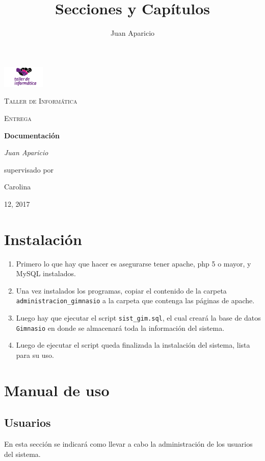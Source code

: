 \documentclass[a4paper, 12pt, spanish]{report}
\title{Secciones y Capítulos}
\author{Juan Aparicio}
\begin{document}
\begin{titlepage}
	\centering
	\includegraphics[width=0.15\textwidth]{imagenes/logo.png}\par\vspace{1cm}
	{\scshape\LARGE Taller de Informática\par}
	\vspace{1cm}
	{\scshape\Large Entrega\par}
	\vspace{1.5cm}
	{\huge\bfseries Documentación\par}
	\vspace{2cm}
	{\Large\itshape Juan Aparicio\par}
	\vfill
	supervisado por \par
	Carolina 		
	\vfill
	{\large 12, 2017\par}
\end{titlepage}

\tableofcontents
\newpage


\chapter{Instalación}
\begin{enumerate}
	\item Primero lo que hay que hacer es asegurarse tener apache, php 5 o mayor, y MySQL instalados.
	\item Una vez instalados los programas, copiar el contenido de la carpeta \verb|administracion_gimnasio| a la carpeta que contenga las páginas de apache.
	\item Luego hay que ejecutar el script \verb|sist_gim.sql|, el cual creará la base de datos \verb|Gimnasio| en donde se almacenará toda la información del sistema.
	\item Luego de ejecutar el script queda finalizada la instalación del sistema, lista para su uso.
\end{enumerate}

\chapter{Manual de uso}
\section{Usuarios}
\par En esta sección se indicará como llevar a cabo la administración de los usuarios del sistema.
\end{document}
